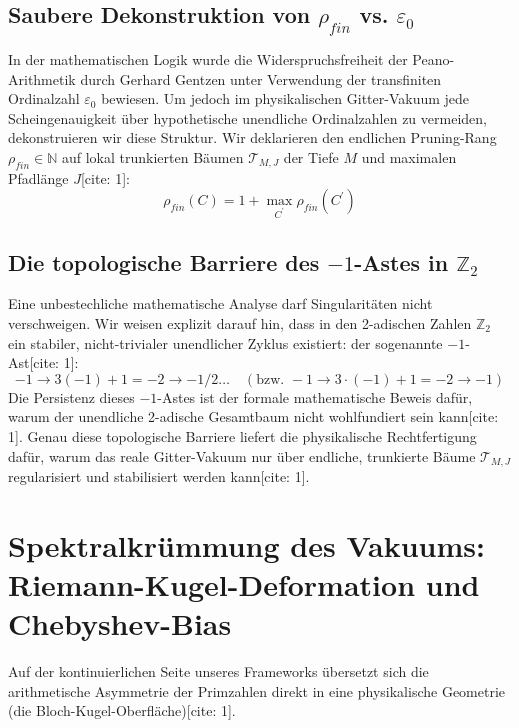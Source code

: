 \documentclass[11pt,a4paper]{article}
\begin{document}
	\subsection{Saubere Dekonstruktion von $\rho_{fin}$ vs. $\varepsilon_0$}
	In der mathematischen Logik wurde die Widerspruchsfreiheit der Peano-Arithmetik durch Gerhard Gentzen unter Verwendung der transfiniten Ordinalzahl $\varepsilon_0$ bewiesen. Um jedoch im physikalischen Gitter-Vakuum jede Scheingenauigkeit über hypothetische unendliche Ordinalzahlen zu vermeiden, dekonstruieren wir diese Struktur.
	Wir deklarieren den endlichen Pruning-Rang $\rho_{fin}\in\mathbb{N}$ auf lokal trunkierten Bäumen $\mathcal{T}_{M,J}$ der Tiefe $M$ und maximalen Pfadlänge $J$[cite: 1]:
	\begin{equation}
		\rho_{fin}(C)=1+\max_{C^{\prime}}\rho_{fin}(C^{\prime})
	\end{equation}
	
	\subsection{Die topologische Barriere des $-1$-Astes in $\mathbb{Z}_2$}
	Eine unbestechliche mathematische Analyse darf Singularitäten nicht verschweigen. Wir weisen explizit darauf hin, dass in den 2-adischen Zahlen $\mathbb{Z}_2$ ein stabiler, nicht-trivialer unendlicher Zyklus existiert: der sogenannte $-1$-Ast[cite: 1]:
	\begin{equation}
		-1 \longrightarrow 3(-1)+1 = -2 \longrightarrow -1 / 2 \dots \quad (\text{bzw. } -1 \to 3\cdot(-1)+1 = -2 \to -1)
	\end{equation}
	Die Persistenz dieses $-1$-Astes ist der formale mathematische Beweis dafür, warum der unendliche 2-adische Gesamtbaum nicht wohlfundiert sein kann[cite: 1]. Genau diese topologische Barriere liefert die physikalische Rechtfertigung dafür, warum das reale Gitter-Vakuum nur über endliche, trunkierte Bäume $\mathcal{T}_{M,J}$ regularisiert und stabilisiert werden kann[cite: 1].
	
	\section{Spektralkrümmung des Vakuums: Riemann-Kugel-Deformation und Chebyshev-Bias}
	Auf der kontinuierlichen Seite unseres Frameworks übersetzt sich die arithmetische Asymmetrie der Primzahlen direkt in eine physikalische Geometrie (die Bloch-Kugel-Oberfläche)[cite: 1].
	
\end{document}
